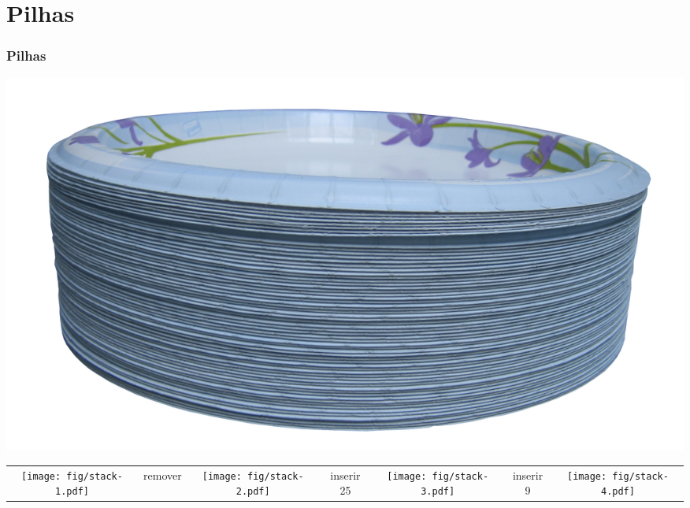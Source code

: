 \documentclass{beamer}
\begin{document}
\section{Pilhas}

\begin{frame}
  \frametitle{Pilhas}

  \begin{center}
    \includegraphics[width=.5\textwidth]{img/stack-of-plates.png}
  \end{center}

  \pause
  \begin{center}
    \begin{tabular}{ccccccc}
      \texttt{[image: fig/stack-1.pdf]}
      &
      remover
      &
      \texttt{[image: fig/stack-2.pdf]}
      &
      inserir 25
      &
      \texttt{[image: fig/stack-3.pdf]}
      &
      inserir 9
      &
      \texttt{[image: fig/stack-4.pdf]}
    \end{tabular}
  \end{center}

\end{frame}
\end{document}
